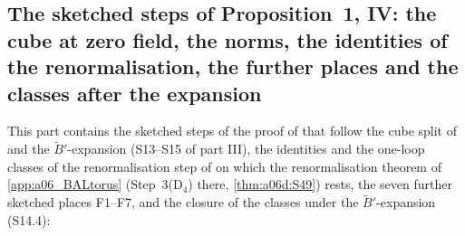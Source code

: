 
\subsection{The sketched steps of Proposition~1, IV: the cube at zero field, the norms, the identities of the renormalisation, the further places and the classes after the expansion}\label{sup4:sec}

This part contains the sketched steps of the proof of \cite[Prop.~1, (1.33)]{Ba3} that follow the cube split of \cite[p.~433]{Ba3} and the $\tilde B'$-expansion (S13--S15 of part III), the identities and the one-loop classes of the renormalisation step of \cite[pp.~434--445]{Ba3} on which the renormalisation theorem of \cref{app:a06_BALtorus} (Step~3(D$_4$) there, \cref{thm:a06d:S49}) rests, the seven further sketched places F1--F7, and the closure of the classes under the $\tilde B'$-expansion (S14.4):

